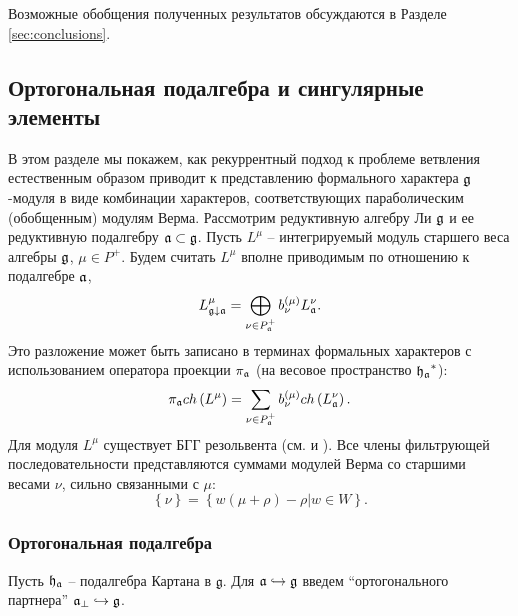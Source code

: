 Возможные обобщения полученных результатов обсуждаются в Разделе \ref{sec:conclusions}.


\subsection{Ортогональная подалгебра и сингулярные элементы}

\label{sec:recurr-form-branch}

В этом разделе мы покажем, как рекуррентный подход к проблеме ветвления естественным образом приводит к представлению формального характера $\frak{g}$-модуля в виде комбинации характеров, соответствующих параболическим (обобщенным) модулям Верма. Рассмотрим редуктивную алгебру Ли  $\frak{g}$ и ее редуктивную подалгебру $\frak{a}\subset \frak{g}$.
Пусть  $L^{\mu} $ -- интегрируемый модуль старшего веса алгебры  $\frak{g}$, $\mu \in P^{+}$.  Будем считать  $L^{\mu}$ вполне приводимым по отношению к подалгебре $\frak{a}$,
\begin{equation*}
L_{\frak{g}\downarrow \frak{a}}^{\mu }=\bigoplus\limits_{\nu \in P_{\frak{a}%
}^{+}}b_{\nu }^{\left( \mu \right) }L_{\frak{a}}^{\nu }.
\end{equation*}
Это разложение может быть записано в терминах формальных характеров с использованием оператора проекции  $\pi _{\frak{a}}$ (на весовое пространство $\frak{h_{a}}^{\ast }$):
\begin{equation}
\pi _{\frak{a}}ch\left( L^{\mu }\right) =\sum_{\nu \in P_{\frak{a}%
}^{+}}b_{\nu }^{(\mu )}ch\left( L_{\frak{a}}^{\nu }\right) .
\label{branching1}
\end{equation}
Для модуля  $L^{\mu }$ существует БГГ резольвента (см. \cite
{bernstein1976category,bernstein1975differential,bernstein1971structure} и
\cite{humphreys2008representations}). Все члены фильтрующей последовательности представляются суммами модулей Верма со старшими весами $\nu$, сильно связанными с $\mu$:
\begin{equation*}
\left\{ \nu \right\} =\left\{ w\left( \mu +\rho \right) -\rho |w\in
W\right\} .
\end{equation*}

\subsubsection{Ортогональная подалгебра}

Пусть  $\frak{h}_{\frak{a}}$ -- подалгебра Картана в  $\mathfrak{g}$. Для  $\mathfrak{a}\hookrightarrow \frak{g}$ введем ``ортогонального партнера''  $\mathfrak{a}_{\bot }\hookrightarrow \frak{g}$.

